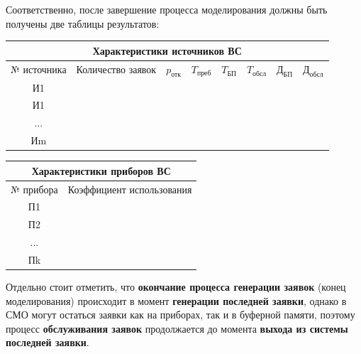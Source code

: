 \documentclass[a4paper, 14pt]{article}
\begin{document}
Соответственно, после завершение процесса моделирования должны быть получены две таблицы результатов:

\begin{center}
	\begin{tabular}{|c|c|c|c|c|c|c|c|}
		\hline
		\multicolumn{8}{|c|}{Характеристики источников ВС}                                                                                                   \\
		\hline
		№ источника & Количество заявок & $p_\text{отк}$ & $T_\text{преб}$ & $T_\text{БП}$ & $T_\text{обсл}$ & $\text{Д}_\text{БП}$ & $\text{Д}_\text{обсл}$ \\
		\hline
		И1          &                   &                &                 &               &                 &                      &                        \\
		\hline
		И1          &                   &                &                 &               &                 &                      &                        \\
		\hline
		...         &                   &                &                 &               &                 &                      &                        \\
		\hline
		Иm          &                   &                &                 &               &                 &                      &                        \\
		\hline
	\end{tabular}
\end{center}

\begin{center}
	\begin{tabular}{|c|c|}
		\hline
		\multicolumn{2}{|c|}{Характеристики приборов ВС} \\
		\hline
		№ прибора & Коэффициент использования            \\
		\hline
		П1        &                                      \\
		\hline
		П2        &                                      \\
		\hline
		...       &                                      \\
		\hline
		Пk        &                                      \\
		\hline
	\end{tabular}
\end{center}

Отдельно стоит отметить, что \textbf{окончание процесса генерации заявок} (конец моделирования) происходит в момент \textbf{генерации последней заявки}, однако в СМО могут остаться заявки как на приборах, так и в буферной памяти, поэтому процесс \textbf{обслуживания заявок} продолжается до момента \textbf{выхода из системы последней заявки}.
\end{document}
